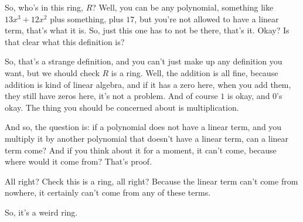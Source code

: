 \begin{hidden}
\end{hidden}

\begin{content}
\end{content}

\begin{speech}[00:23:45 - 00:25:05]
So, who's in this ring, $R$? Well, you can be any polynomial, something like $13 x^3 + 12 x^2$  plus something, plus $17$,  but you're not allowed to have a linear term, that's what it is. So, just this one has to not be there, that's it. Okay? Is that clear what this definition is?

So, that's a strange definition, and you can't just make up any definition you want, but we should check  $R$ is a ring. Well, the addition is all fine, because addition is kind of linear algebra, and if it has a zero here, when you add them, they still have zeros here, it's not a problem. And of course $1$ is okay, and $0$'s okay. The thing you should be concerned about is multiplication.

And so, the question is: if a polynomial does not have a linear term, and you multiply it by another polynomial that doesn't have a linear term, can a linear term come? And if you think about it for a moment, it can't come, because where would it come from? That's proof.

All right? Check this is a ring, all right? Because the linear term can't come from nowhere, it certainly can't come from any of these terms. 

So, it's a weird ring.
\end{speech}

